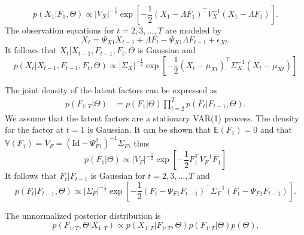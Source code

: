 \begin{equation}
	p \left( X_1 | F_1, \Theta \right) \propto \lvert V_X \rvert^{-\frac12} \exp \left[ -\frac12 \left( X_1 - \Lambda F_1 \right)^{\top} V_X^{-1} \left( X_1 - \Lambda F_1 \right) \right].
\end{equation}
The observation equations for $t = 2, 3, \ldots, T$ are modeled by 
\begin{equation}
	X_t = \Psi_{X1} X_{t-1} + \Lambda F_t - \Psi_{X1} \Lambda F_{t-1} + \epsilon_{Xt}.
\end{equation}
It follows that $X_t | X_{t-1}, F_{t-1}, F_t, \Theta$ is Gaussian and
\begin{equation}
	p \left( X_t | X_{t-1}, F_{t-1}, F_t, \Theta \right) \propto \lvert \Sigma_X \rvert^{-\frac12} \exp \left[ -\frac12 \left( X_t - \mu_{Xt} \right)^{\top} \Sigma_X^{-1} \left( X_t - \mu_{Xt} \right) \right]
\end{equation}

The joint density of the latent factors can be expressed as
\begin{align}
	p \left( F_{1:T} | \Theta \right)
	&= p \left(F_1 | \Theta \right)	\prod_{t = 2}^T p \left( F_t | F_{t-1}, \Theta \right).
\end{align}
We assume that the latent factors are a stationary VAR(1) process. The density for the factor at $t = 1$ is Gaussian. It can be shown that $\mathbb E \left( F_1 \right) = 0$ and that $\mathbb V \left( F_1 \right) = V_F = \left( \text{Id} - \Psi_{F1}^2 \right)^{-1} \Sigma_F$, thus
\begin{equation}
	p \left( F_1 | \Theta \right) \propto \lvert V_F \rvert^{-\frac12} \exp \left[ -\frac12 F_1^{\top} V_F^{-1} F_1 \right]
\end{equation}
 It follows that $F_t | F_{t-1}$ is Gaussian for $t = 2, 3, \ldots, T$ and
 \begin{equation}
 	p \left( F_t | F_{t-1}, \Theta \right) \propto \lvert \Sigma_F \rvert^{-\frac12} \exp \left[ -\frac12 \left( F_t - \Psi_{F1} F_{t-1} \right)^{\top} \Sigma_F^{-1} \left( F_t - \Psi_{F1} F_{t-1} \right) \right].
 \end{equation}
 
 The unnormalized posterior distribution is
 \begin{equation} \label{unnormal-post-dist}
 	p \left( F_{1:T}, {\Theta} | X_{1:T} \right)	\propto p \left( X_{1:T} | F_{1:T}, \Theta \right) p \left( F_{1:T} | \Theta \right) p \left( \Theta \right).
 \end{equation}

